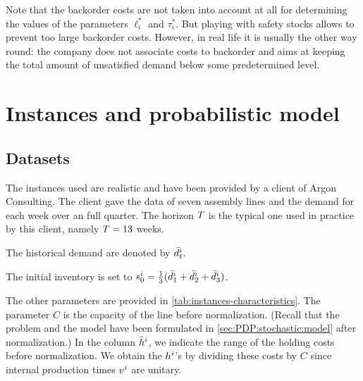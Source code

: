 Note that the backorder costs are not taken into account at all for determining the values of the parameters $\ell_i^*$ and $\tau_i^*$.
But playing with safety stocks allows to prevent too large backorder costs.
However, in real life it is usually the other way round: the company does not associate costs to backorder and aims at keeping the total amount of unsatisfied demand below some predetermined level.




\section{Instances and probabilistic model}
\label{sec:PDP:numerical-experiments:instances}


\subsection{Datasets}
\label{sec:PDP:numerical-experiments:historical-data}

The instances used are realistic and have been provided by a client of Argon Consulting.
The client gave the data of seven assembly lines and the demand for each week over an full quarter.
The horizon $T$ is the typical one used in practice by this client, namely $T=13$ weeks.

The historical demand are denoted by $\bar{d}_t^i$.

The initial inventory is set to $s_0^i=\frac{1}{3}(\bar{d}_1^i+\bar{d}_2^i+\bar{d}_3^i)$.

The other parameters are provided in \cref{tab:instances-characteristics}.
The parameter $C$ is the capacity of the line before normalization.
(Recall that the problem and the model have been formulated in \cref{sec:PDP:stochastic:model} after normalization.)
In the column $\tilde{h}^i$, we indicate the range of the holding costs before normalization.
We obtain the $h^i$'s by dividing these costs by $C$ since internal production times $v^i$ are unitary.

